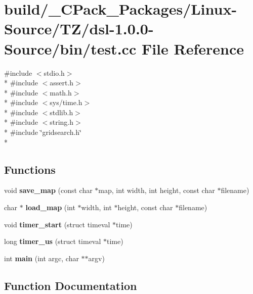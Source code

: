 \section{build/\-\_\-\-C\-Pack\-\_\-\-Packages/\-Linux-\/\-Source/\-T\-Z/dsl-\/1.0.0-\/\-Source/bin/test.cc File Reference}
\label{build_2__CPack__Packages_2Linux-Source_2TZ_2dsl-1_80_80-Source_2bin_2test_8cc}
{\ttfamily \#include $<$stdio.\-h$>$}\\*
{\ttfamily \#include $<$assert.\-h$>$}\\*
{\ttfamily \#include $<$math.\-h$>$}\\*
{\ttfamily \#include $<$sys/time.\-h$>$}\\*
{\ttfamily \#include $<$stdlib.\-h$>$}\\*
{\ttfamily \#include $<$string.\-h$>$}\\*
{\ttfamily \#include \char`\"{}gridsearch.\-h\char`\"{}}\\*
\subsection*{Functions}
\begin{DoxyCompactItemize}
\item 
void {\bf save\-\_\-map} (const char $\ast$map, int width, int height, const char $\ast$filename)
\item 
char $\ast$ {\bf load\-\_\-map} (int $\ast$width, int $\ast$height, const char $\ast$filename)
\item 
void {\bf timer\-\_\-start} (struct timeval $\ast$time)
\item 
long {\bf timer\-\_\-us} (struct timeval $\ast$time)
\item 
int {\bf main} (int argc, char $\ast$$\ast$argv)
\end{DoxyCompactItemize}


\subsection{Function Documentation}
